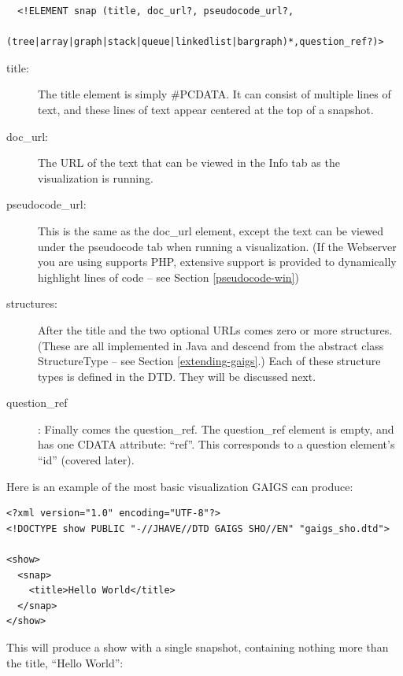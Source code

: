 \documentclass[12pt]{article}
\begin{document}
\footnotesize \begin{verbatim}
  <!ELEMENT snap (title, doc_url?, pseudocode_url?,
                  (tree|array|graph|stack|queue|linkedlist|bargraph)*,question_ref?)>
\end{verbatim} \normalsize

\begin{description}
\item[title:]  The title element is simply \#PCDATA. It can consist of
  multiple lines of text, and these lines of text appear centered at
  the top of a snapshot.
  

\item [doc\_url:] The URL of the text that can be viewed in the Info
  tab as the visualization is running. 

  
\item [pseudocode\_url:] This is the same as the doc\_url element,
  except the text can be viewed under the pseudocode tab when running
  a visualization.  (If the Webserver you are using supports PHP,
  extensive support is provided to dynamically highlight lines of code
  -- see Section \ref{pseudocode-win})
  
  
\item [structures:] After the title and the two optional URLs comes
  zero or more structures. (These are all implemented in Java and
  descend from the abstract class StructureType -- see Section
  \ref{extending-gaigs}.) Each of these structure types is defined in
  the DTD. They will be discussed next.
  

\item [question\_ref]: Finally comes the question\_ref. The question\_ref
  element is empty, and has one CDATA attribute: ``ref''. This
  corresponds to a question element's ``id'' (covered later).

\end{description}



Here is an example of the most basic visualization GAIGS can produce:

\footnotesize \begin{verbatim}
<?xml version="1.0" encoding="UTF-8"?>
<!DOCTYPE show PUBLIC "-//JHAVE//DTD GAIGS SHO//EN" "gaigs_sho.dtd">

<show>
  <snap>
    <title>Hello World</title>
  </snap>
</show>
\end{verbatim} \normalsize

This will produce a show with a single snapshot, containing nothing more than the title, ``Hello World'':
\end{document}
